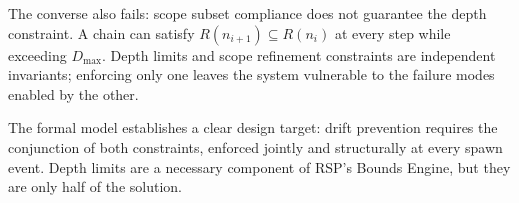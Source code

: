 The converse also fails: scope subset compliance does not guarantee the depth constraint. A chain can satisfy $R(n_{i+1}) \subseteq R(n_i)$ at every step while exceeding $D_{\max}$. Depth limits and scope refinement constraints are independent invariants; enforcing only one leaves the system vulnerable to the failure modes enabled by the other.

The formal model establishes a clear design target: drift prevention requires the conjunction of both constraints, enforced jointly and structurally at every spawn event. Depth limits are a necessary component of RSP's Bounds Engine, but they are only half of the solution.

